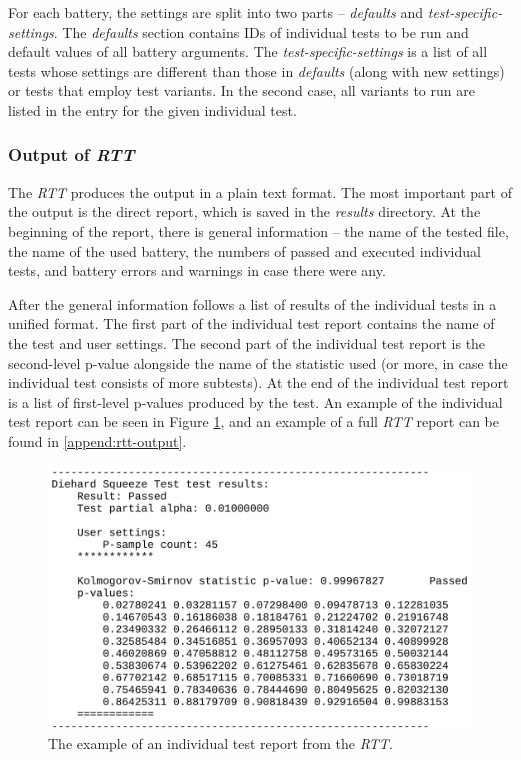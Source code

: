 \documentclass[
  digital,     %
  oneside,     %
  nosansbold,  %
  nocolorbold, %
  nolof,         %
  nolot,         %
]{fithesis4}
\begin{document}
For each battery, the settings are split into two parts -- \emph{defaults} and \emph{test-specific-settings}. The \emph{defaults} section contains IDs of individual tests to be run and default values of all battery arguments. The \emph{test-specific-settings} is a list of all tests whose settings are different than those in \emph{defaults} (along with new settings) or tests that employ test variants. In the second case, all variants to run are listed in the entry for the given individual test.

\subsubsection{Output of \emph{RTT}}
The \emph{RTT} produces the output in a plain text format. The most important part of the output is the direct report, which is saved in the \emph{results} directory. At the beginning of the report, there is general information -- the name of the tested file, the name of the used battery, the numbers of passed and executed individual tests, and battery errors and warnings in case there were any.

After the general information follows a list of results of the individual tests in a unified format. The first part of the individual test report contains the name of the test and user settings. The second part of the individual test report is the second-level p-value alongside the name of the statistic used (or more, in case the individual test consists of more subtests). At the end of the individual test report is a list of first-level p-values produced by the test. An example of the individual test report can be seen in Figure \ref{fig:rtt_output_example}, and an example of a full \emph{RTT} report can be found in \ref{append:rtt-output}.

\begin{figure}[h]
  \begin{center}
    \includegraphics[width=12cm]{figures/rtt_dieharder_output.jpg}
  \end{center}
  \caption{The example of an individual test report from the \emph{RTT}.}
  \label{fig:rtt_output_example}
\end{figure}
\end{document}

